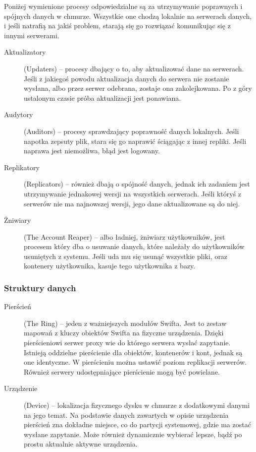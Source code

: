 Poniżej wymienione procesy odpowiedzialne są za utrzymywanie poprawnych i spójnych danych w chmurze. Wszystkie one chodzą lokalnie na serwerach danych, i jeśli natrafią na jakiś problem, starają się go rozwiązać komunikując się z innymi serwerami.

\begin{description}
\item[Aktualizatory] (Updaters) -- procesy dbający o to, aby aktualizować dane na serwerach. Jeśli z jakiegoś powodu aktualizacja danych do serwera nie zostanie wysłana, albo przez serwer odebrana, zostaje ona zakolejkowana. Po z góry ustalonym czasie próba aktualizacji jest ponawiana.
\item[Audytory] (Auditors) -- procesy sprawdzający poprawność danych lokalnych. Jeśli napotka zepsuty plik, stara się go naprawić ściągając z innej repliki. Jeśli naprawa jest niemożliwa, błąd jest logowany. 
\item[Replikatory] (Replicators) -- również dbają o spójność danych, jednak ich zadaniem jest utrzymywanie jednakowej wersji na wszystkich serwerach. Jeśli któryś z serwerów nie ma najnowszej wersji, jego dane aktualizowane są do niej.
\item[Żniwiary] (The Account Reaper) -- albo ładniej, żniwiarz użytkowników, jest procesem który dba o usuwanie danych, które należały do użytkowników usuniętych z systemu. Jeśli uda mu się usunąć wszystkie pliki, oraz kontenery użytkownika, kasuje tego użytkownika z bazy.
\end{description}

\subsubsection{Struktury danych}\label{sub:struktury danych}

\begin{description}
\item[Pierścień] (The Ring) -- jeden z ważniejszych modułów Swifta. Jest to zestaw mapowań z kluczy obiektów Swifta na fizyczne urządzenia. Dzięki pierścieniowi serwer proxy wie do którego serwera wysłać zapytanie. Istnieją oddzielne pierścienie dla obiektów, kontenerów i kont, jednak są one identyczne. W pierścieniu można ustawić poziom replikacji serwerów. Również serwery udostępniające pierścienie mogą być powielane.
\item[Urządzenie] (Device) -- lokalizacja fizycznego dysku w chmurze z dodatkowymi danymi na jego temat. Na podstawie danych zawartych w opisie urządzenia pierścień zna dokładne miejsce, co do partycji systemowej, gdzie ma zostać wysłane zapytanie. Może również dynamicznie wybierać lepsze, bądź po prostu aktualnie aktywne urządzenia.
\end{description}

